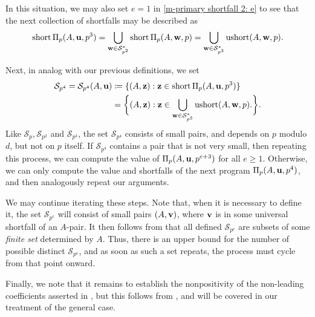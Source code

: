 \documentclass[11pt]{amsart}
\newcommand{\short}{\operatorname{short}}
\newcommand{\ushort}{\operatorname{ushort}}
\newcommand{\denom}{d}
\renewcommand{\S}{\mathcal{S}}
\begin{document}
In this situation, we may also set $e=1$ in \eqref{m-primary shortfall 2: e} to see that the next collection of shortfalls may be described as 
%
\[\short \IP_p(A,\vv{u},p^3) = \bigcup_{\vv{w} \in \S_{p^2}^{\ast}} \short \IP_p(A,\vv{w},p) = \bigcup_{\vv{w} \in \S_{p^3}^{\ast}} \ushort(A,\vv{w},p). \]  

Next, in analog with our previous definitions, we set %
\begin{align*}
\S_{p^4} = \S_{p^4}(A,\vv{u}) & \coloneqq \{ (A,\vv{z}):  \vv{z} \in \short \IP_p(A,\vv{u},p^3) \} \\
 & = \bigg\{ (A,\vv{z}): \vv{z} \in \bigcup_{\vv{w} \in \S_{p^3}^{\ast}} \ushort(A,\vv{w},p).\bigg\}. 
\end{align*}
Like $\S_p,\S_{p^2}$ and $\S_{p^3}$, the set $\S_{p^4}$ consists of small pairs, and depends on $p$ modulo $\denom$, but not on $p$ itself.
If $\S_{p^4}$ contains a pair that is not very small, then repeating this process, we can compute the value of $\Pi_p(A,\mathbf{u},p^{e+3})$ for all $e \geq 1$.
Otherwise, we can only compute the value and shortfalls of the next program $\Pi_p(A,\mathbf{u},p^{4})$, and then analogously repeat our arguments.

We may continue iterating these steps.
Note that, when it is necessary to define it, the set $\S_{p^e}$ will consist of small pairs $(A,\mathbf{v})$, where $\mathbf{v}$ is in some universal shortfall of an $A$-pair.
It then follows from  that all defined $\S_{p^e}$ are subsets of some \emph{finite set} determined by $A$.
Thus, there is an upper bound for the number of possible distinct  $\S_{p^e}$, and as soon as such a set repeats, the process must cycle from that point onward.

Finally, we note that it remains to establish the nonpositivity of the non-leading coefficients asserted in , but this follows from  , and will be covered in our treatment of the general case.

\end{document}
